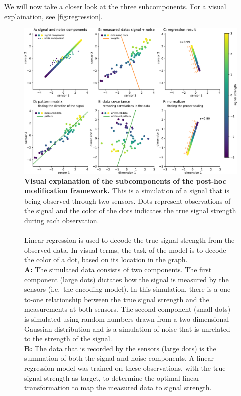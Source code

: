 \documentclass[a4paper]{vanvliet_paper}
\begin{document}
We will now take a closer look at the three subcomponents.
For a visual explaination, see \autoref{fig:regression}.
\begin{figure}[p]
    \includegraphics[width=18cm]{figures/regression.pdf}
    \vspace{2ex}
    \caption{\textbf{Visual explanation of the subcomponents of the post-hoc modification framework.}
    This is a simulation of a signal that is being observed through two sensors.
    Dots represent observations of the signal and the color of the dots indicates the true signal strength during each observation.\\
    \\
    Linear regression is used to decode the true signal strength from the observed data.
    In visual terms, the task of the model is to decode the color of a dot, based on its location in the graph.\\
    \textbf{A:} The simulated data consists of two components.
    The first component (large dots) dictates how the signal is measured by the sensors (i.e.\ the encoding model).
    In this simulation, there is a one-to-one relationship between the true signal strength and the measurements at both sensors.
    The second component (small dots) is simulated using random numbers drawn from a two-dimensional Gaussian distribution and is a simulation of noise that is unrelated to the strength of the signal.\\
    \textbf{B:} The data that is recorded by the sensors (large dots) is the summation of both the signal and noise components.
    A linear regression model was trained on these observations, with the true signal strength as target, to determine the optimal linear transformation to map the measured data to signal strength.
}
\end{figure}
\end{document}
